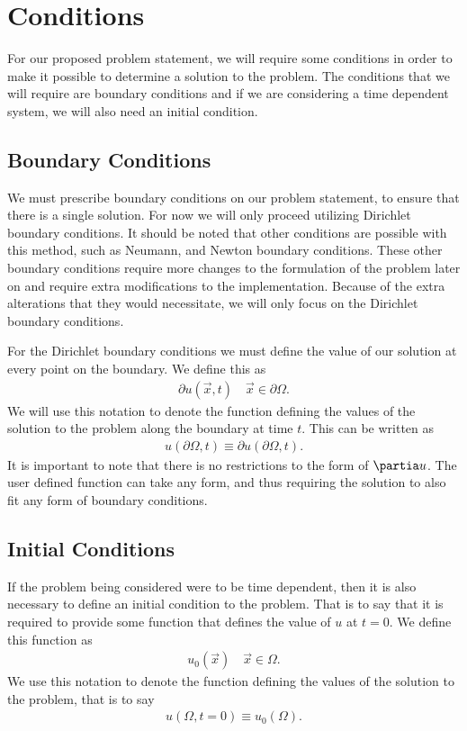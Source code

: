 \documentclass[../fem.tex]{subfile}
\begin{document}
\section{Conditions}%
\label{sec:conditions}

For our proposed problem statement, we will require some conditions in order to
make it possible to determine a solution to the problem. The conditions that we
will require are boundary conditions and if we are considering a time dependent
system, we will also need an initial condition.

\subsection{Boundary Conditions}%
\label{sub:boundary_conditions}

We must prescribe boundary conditions on our problem statement, to ensure that
there is a single solution. For now we will only proceed utilizing Dirichlet
boundary conditions. It should be noted that other conditions are possible with
this method, such as Neumann, and Newton boundary conditions. These other
boundary conditions require more changes to the formulation of the problem
later on and require extra modifications to the implementation. Because of the
extra alterations that they would necessitate, we will only focus on the
Dirichlet boundary conditions.

For the Dirichlet boundary conditions we must define the value of our solution
at every point on the boundary. We define this as
\begin{align*}
  \partial u(\vec{x},t)\quad\vec{x}\in\partial\Omega.
\end{align*}
We will use this notation to denote the function defining the values of the
solution to the problem along the boundary at time $t$. This can be written as
\begin{align*}
  u(\partial\Omega,t)\equiv\partial u(\partial\Omega,t).
\end{align*}
It is important to note that there is no restrictions to the form of $\partia
u$. The user defined function can take any form, and thus requiring the
solution to also fit any form of boundary conditions.

\subsection{Initial Conditions}%
\label{sub:initial_conditions}

If the problem being considered were to be time dependent, then it is also
necessary to define an initial condition to the problem. That is to say that it
is required to provide some function that defines the value of $u$ at $t=0$. We
define this function as
\begin{align*}
  u_0(\vec{x})\quad\vec{x}\in\Omega.
\end{align*}
We use this notation to denote the function defining the values of the
solution to the problem, that is to say
\begin{align*}
  u(\Omega,t=0)\equiv u_0(\Omega).
\end{align*}
\end{document}
